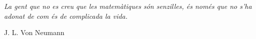 \begin{flushright}
	\vspace*{\fill}
	\textit{La gent que no es creu que les matemàtiques són senzilles,
		és només que no s'ha adonat de com és de complicada la vida.}
	
	J. L. Von Neumann
	\vspace*{\fill}
\end{flushright}
